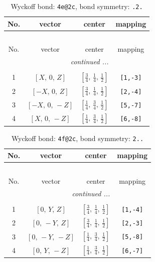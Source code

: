 \documentclass[fleqn,8pt]{jsarticle}
\begin{document}
\renewcommand{\arraystretch}{1.2}
\begin{longtable}{cccc}
\caption{Wyckoff bond: {\tt 4e@2c}, bond symmetry: {\tt .2.}}
 \\
 \hline \hline
No. & vector & center & mapping \\ \hline \endfirsthead

\multicolumn{3}{l}{\tablename\ \thetable{}} \\
 \hline \hline
No. & vector & center & mapping \\ \hline \endhead

 \hline \hline
\multicolumn{3}{r}{\footnotesize\it continued ...} \\ \endfoot

 \hline \hline
\multicolumn{3}{r}{} \\ \endlastfoot

1 & $\left[ X,\, 0,\, Z \right]$ & $\left[ \frac{3}{4},\, \frac{1}{4},\, \frac{1}{2} \right]$ & {\tt [1,-3]} \\ \hline
2 & $\left[ - X,\, 0,\, Z \right]$ & $\left[ \frac{3}{4},\, \frac{1}{4},\, \frac{1}{2} \right]$ & {\tt [2,-4]} \\ \hline
3 & $\left[ - X,\, 0,\, - Z \right]$ & $\left[ \frac{1}{4},\, \frac{3}{4},\, \frac{1}{2} \right]$ & {\tt [5,-7]} \\ \hline
4 & $\left[ X,\, 0,\, - Z \right]$ & $\left[ \frac{1}{4},\, \frac{3}{4},\, \frac{1}{2} \right]$ & {\tt [6,-8]} \\
\end{longtable}
\renewcommand{\arraystretch}{1.2}
\begin{longtable}{cccc}
\caption{Wyckoff bond: {\tt 4f@2c}, bond symmetry: {\tt 2..}}
 \\
 \hline \hline
No. & vector & center & mapping \\ \hline \endfirsthead

\multicolumn{3}{l}{\tablename\ \thetable{}} \\
 \hline \hline
No. & vector & center & mapping \\ \hline \endhead

 \hline \hline
\multicolumn{3}{r}{\footnotesize\it continued ...} \\ \endfoot

 \hline \hline
\multicolumn{3}{r}{} \\ \endlastfoot

1 & $\left[ 0,\, Y,\, Z \right]$ & $\left[ \frac{3}{4},\, \frac{1}{4},\, \frac{1}{2} \right]$ & {\tt [1,-4]} \\ \hline
2 & $\left[ 0,\, - Y,\, Z \right]$ & $\left[ \frac{3}{4},\, \frac{1}{4},\, \frac{1}{2} \right]$ & {\tt [2,-3]} \\ \hline
3 & $\left[ 0,\, - Y,\, - Z \right]$ & $\left[ \frac{1}{4},\, \frac{3}{4},\, \frac{1}{2} \right]$ & {\tt [5,-8]} \\ \hline
4 & $\left[ 0,\, Y,\, - Z \right]$ & $\left[ \frac{1}{4},\, \frac{3}{4},\, \frac{1}{2} \right]$ & {\tt [6,-7]} \\
\end{longtable}
\end{document}
